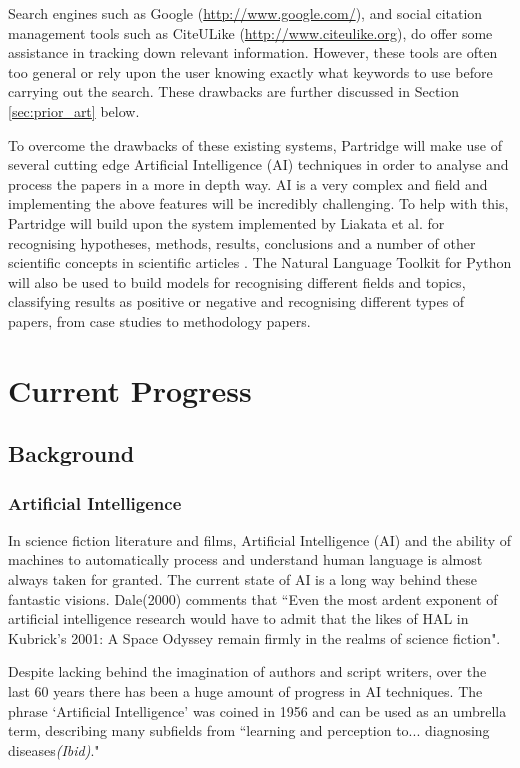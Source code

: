 \documentclass[12pt,a4paper]{article}
\begin{document}
Search engines such as Google ({\url{http://www.google.com/}}), and social
citation management tools such as CiteULike ({\url{http://www.citeulike.org}}),
do offer some assistance in tracking down relevant information. However, these
tools are often too general or rely upon the user knowing exactly what keywords
to use before carrying out the search. These drawbacks are further discussed in 
Section \ref{sec:prior_art} below.

To overcome the drawbacks of these existing systems, Partridge will make use of
several cutting edge Artificial Intelligence (AI) techniques in order to analyse and
process the papers in a more in depth way. AI is a very complex and field and
implementing the above features will be incredibly challenging. To help with
this, Partridge will build upon the system implemented by Liakata et al. for
recognising hypotheses, methods, results, conclusions and a number of other
scientific concepts in scientific articles \cite{citeulike:10444769}. The
Natural Language Toolkit for Python will also be used to build models for
recognising different fields and topics, classifying results as positive or
negative and recognising different types of papers, from case studies to
methodology papers\cite{bird2009natural}.

\section{Current Progress}

\subsection{Background}

\subsubsection{Artificial Intelligence}
In science fiction literature and films, Artificial Intelligence (AI) and the
ability of machines to automatically process and understand human language is
almost always taken for granted. The current state of AI is a long way behind these
fantastic visions. Dale(2000) comments that ``Even the most ardent exponent of
artificial intelligence research would have to admit that the likes of HAL in
Kubrick's 2001: A Space Odyssey remain firmly in the realms of science
fiction\cite{dale2000handbook}".

Despite lacking behind the imagination of authors and script writers, over the last 60 years there
has been a huge amount of progress in AI techniques. The phrase `Artificial
Intelligence' was coined in 1956\cite{russell2010artificial} and can be used as
an umbrella term, describing many subfields from ``learning and perception
to... diagnosing diseases\emph{(Ibid)}."
\end{document}
